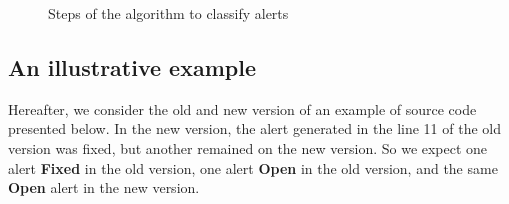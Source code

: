 \documentclass[
]{article}
\begin{document}
\begin{figure}
  \centering
\vspace{5mm}\par
  \caption{Steps of the algorithm to classify alerts}\label{fig:diag}
\end{figure}

\subsection{An illustrative example}\label{source_used}

Hereafter, we consider the old and new version of an example of source
code presented below. In the new version, the alert generated in the
line 11 of the old version was fixed, but another remained on the new
version. So we expect one alert \textbf{Fixed} in the old version, one
alert \textbf{Open} in the old version, and the same \textbf{Open} alert
in the new version.

\scriptsize
\end{document}
